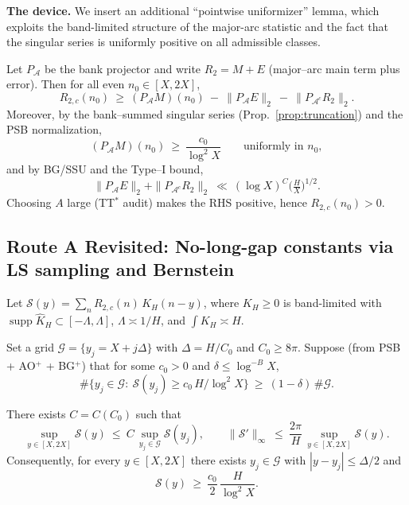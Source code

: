 \medskip
\noindent\textbf{The device.}
We insert an additional ``pointwise uniformizer'' lemma, which exploits the
band-limited structure of the major-arc statistic and the fact that the
singular series is uniformly positive on all admissible classes.

\begin{corollary}\label{cor:pointwise-projection}
Let $P_{\mathcal A}$ be the bank projector and write $R_2=M+E$ (major–arc main term plus error).
Then for all even $n_0\in[X,2X]$,
\[
R_{2,c}(n_0)\ \ge\ (P_{\mathcal A}M)(n_0)\ -\ \|P_{\mathcal A}E\|_2\ -\ \|P_{\mathcal A^c}R_2\|_2.
\]
Moreover, by the bank–summed singular series (Prop.~\ref{prop:truncation}) and the PSB normalization,
\[
(P_{\mathcal A}M)(n_0)\ \ge\ \frac{c_0}{\log^2 X}\qquad\text{uniformly in }n_0,
\]
and by BG/SSU and the Type–I bound,
\[
\|P_{\mathcal A}E\|_2+\|P_{\mathcal A^c}R_2\|_2\ \ll\ (\log X)^C\Big(\tfrac{H}{X}\Big)^{1/2}.
\]
Choosing $A$ large (TT$^\ast$ audit) makes the RHS positive, hence $R_{2,c}(n_0)>0$.
\end{corollary}


\subsection{Route A Revisited: No-long-gap constants via LS sampling and Bernstein}\label{sec:LS-Bernstein}

Let $\mathcal S(y)=\sum_n R_{2,c}(n)\,K_H(n-y)$, where $K_H\ge 0$ is band-limited with $\operatorname{supp}\widehat K_H\subset[-\Lambda,\Lambda]$, $\Lambda\asymp 1/H$, and $\int K_H\asymp H$.

Set a grid $\mathcal G=\{y_j=X+j\Delta\}$ with $\Delta=H/C_0$ and $C_0\ge 8\pi$. Suppose (from PSB + AO$^+$ + BG$^+$) that for some $c_0>0$ and $\delta\le \log^{-B}X$,
\[
\#\{y_j\in\mathcal G:\ \mathcal S(y_j)\ge c_0\,H/\log^2 X\}\ \ge\ (1-\delta)\,\#\mathcal G.
\]

\begin{lemma}\label{lem:LSB}
There exists $C=C(C_0)$ such that
\[
\sup_{y\in[X,2X]} \mathcal S(y)\ \le\ C\,\sup_{y_j\in\mathcal G} \mathcal S(y_j),
\qquad
\|\mathcal S'\|_\infty\ \le\ \frac{2\pi}{H}\,\sup_{y\in[X,2X]}\mathcal S(y).
\]
Consequently, for every $y\in[X,2X]$ there exists $y_j\in\mathcal G$ with $|y-y_j|\le \Delta/2$ and
\[
\mathcal S(y)\ \ge\ \frac{c_0}{2}\,\frac{H}{\log^2 X}.
\]
\end{lemma}

